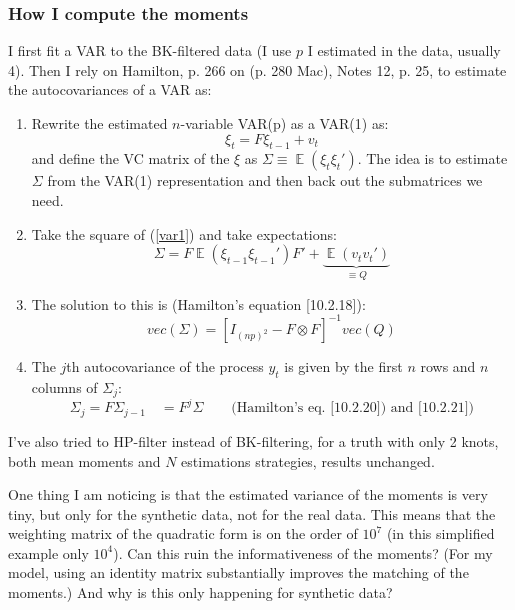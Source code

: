 \documentclass[11pt]{article}
\renewcommand{\[}{\begin{equation}}
\renewcommand{\]}{\end{equation}}
\DeclareMathOperator{\E}{\mathbb{E}}
\begin{document}
\subsubsection{How I compute the moments} 
I first fit a VAR to the BK-filtered data (I use $p$ I estimated in the data, usually 4). Then I rely on Hamilton, p. 266 on (p. 280 Mac), Notes 12, p. 25,  to estimate the autocovariances of a VAR as:
\begin{enumerate}
\item Rewrite the estimated $n$-variable VAR(p) as a VAR(1) as:
\begin{equation}
\xi_t = F\xi_{t-1} + v_t \label{var1}
\end{equation}
and define the VC matrix of the $\xi$ as $\Sigma \equiv \E(\xi_t\xi_t')$. The idea is to estimate $\Sigma$ from the VAR(1) representation and then back out the submatrices we need.
\item Take the square of (\ref{var1}) and take expectations:
\begin{equation}
\Sigma = F\E(\xi_{t-1}\xi_{t-1}')F' + \underbrace{\E(v_tv_t')}_{\equiv Q}
\end{equation}
\item The solution to this is (Hamilton's equation [10.2.18]):
\begin{equation}
vec(\Sigma) = [I_{(np)^2} - F\otimes F]^{-1} vec(Q)
\end{equation}
\item The $j$th autocovariance of the process $y_t$ is given by the first $n$ rows and $n$ columns of $\Sigma_j$:
\begin{equation}
\Sigma_j = F \Sigma_{j-1} \quad = F^j\Sigma \quad \quad \text{(Hamilton's eq. [10.2.20]) and [10.2.21])}
\end{equation}

\end{enumerate}

I've also tried to HP-filter instead of BK-filtering, for a truth with only 2 knots, both  mean moments and $N$ estimations strategies, results unchanged.

One thing I am noticing is that the estimated variance of the moments is very tiny, but only for the synthetic data, not for the real data. This means that the weighting matrix of the quadratic form is on the order of $10^7$ (in this simplified example only $10^4$). Can this ruin the informativeness of the moments? (For my model, using an identity matrix substantially improves the matching of the moments.) And why is this only happening for synthetic data?
\end{document}
